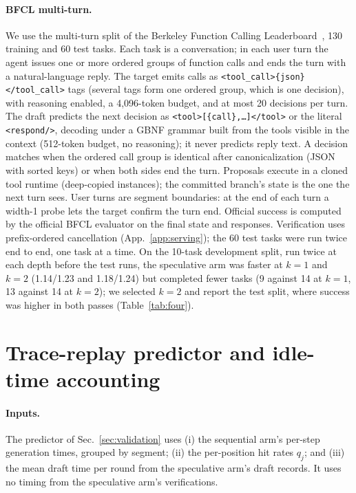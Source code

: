 \paragraph{BFCL multi-turn.}
We use the multi-turn split of the Berkeley Function Calling
Leaderboard~\citep{bfcl}, 130 training and 60 test tasks.
Each task is a conversation; in each user turn the agent issues one or more
ordered groups of function calls and ends the turn with a natural-language
reply. The target emits calls as \texttt{<tool\_call>\{json\}</tool\_call>}
tags (several tags form one ordered group, which is one decision), with
reasoning enabled, a 4{,}096-token budget, and at most 20 decisions per turn.
The draft predicts the next decision as
\texttt{<tool>[\{call\},\ldots]</tool>} or the literal \texttt{<respond/>},
decoding under a GBNF grammar built from the tools visible in the context
(512-token budget, no reasoning); it never predicts reply text. A decision
matches when the ordered call group is identical after canonicalization (JSON
with sorted keys) or when both sides end the turn. Proposals execute in a
cloned tool runtime (deep-copied instances); the committed branch's state is
the one the next turn sees. User turns are segment boundaries: at the end of
each turn a width-1 probe lets the target confirm the turn end. Official
success is computed by the official BFCL evaluator on the final state and
responses. Verification uses prefix-ordered cancellation
(App.~\ref{app:serving}); the 60 test tasks were run twice end to end, one task
at a time. On the 10-task development split, run twice at each depth before
the test runs, the speculative arm was faster at $k{=}1$ and $k{=}2$
(1.14/1.23\xx{} and 1.18/1.24\xx{}) but completed fewer tasks (9 against 14 at
$k{=}1$, 13 against 14 at $k{=}2$); we selected $k{=}2$ and report the test
split, where success was higher in both passes (Table~\ref{tab:four}).

\section{Trace-replay predictor and idle-time accounting}
\label{app:predictor}

\paragraph{Inputs.}
The predictor of Sec.~\ref{sec:validation} uses (i) the sequential arm's
per-step generation times, grouped by segment; (ii) the per-position hit rates
$q_j$; and (iii) the mean draft time per round from the speculative arm's draft
records. It uses no timing from the speculative arm's verifications.

